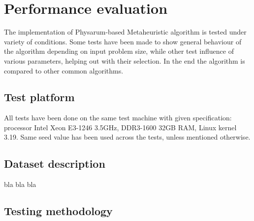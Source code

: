 \section{Performance evaluation}
\label{section:project_evaluation}

The implementation of Physarum-based Metaheuristic algorithm is tested under variety of conditions. Some tests have been made to show general behaviour of the algorithm depending on input problem size, while other test influence of various parameters, helping out with their selection. In the end the algorithm is compared to other common algorithms.


\subsection{Test platform}

All tests have been done on the same test machine with given specification: processor Intel Xeon E3-1246 3.5GHz, DDR3-1600 32GB RAM, Linux kernel 3.19. Same seed value has been used across the tests, unless mentioned otherwise.


\subsection{Dataset description}

bla bla bla

\subsection{Testing methodology}



